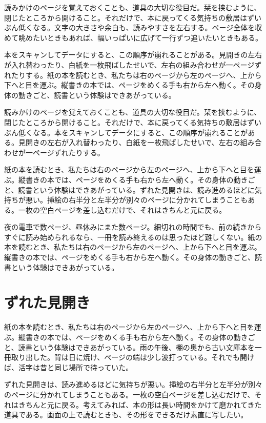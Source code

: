 \documentclass[a5paper,11pt]{ltjtbook}
\begin{document}
読みかけのページを覚えておくことも、道具の大切な役目だ。栞を挟むように、閉じたところから開けること。それだけで、本に戻ってくる気持ちの敷居はずいぶん低くなる。文字の大きさや余白も、読みやすさを左右する。ページ全体を収めて眺めたいときもあれば、幅いっぱいに広げて一行ずつ追いたいときもある。

本をスキャンしてデータにすると、この順序が崩れることがある。見開きの左右が入れ替わったり、白紙を一枚飛ばしたせいで、左右の組み合わせが一ページずれたりする。紙の本を読むとき、私たちは右のページから左のページへ、上から下へと目を運ぶ。縦書きの本では、ページをめくる手も右から左へ動く。その身体の動きごと、読書という体験はできあがっている。

読みかけのページを覚えておくことも、道具の大切な役目だ。栞を挟むように、閉じたところから開けること。それだけで、本に戻ってくる気持ちの敷居はずいぶん低くなる。本をスキャンしてデータにすると、この順序が崩れることがある。見開きの左右が入れ替わったり、白紙を一枚飛ばしたせいで、左右の組み合わせが一ページずれたりする。

紙の本を読むとき、私たちは右のページから左のページへ、上から下へと目を運ぶ。縦書きの本では、ページをめくる手も右から左へ動く。その身体の動きごと、読書という体験はできあがっている。ずれた見開きは、読み進めるほどに気持ちが悪い。挿絵の右半分と左半分が別々のページに分かれてしまうこともある。一枚の空白ページを差し込むだけで、それはきちんと元に戻る。

夜の電車で数ページ、昼休みにまた数ページ。細切れの時間でも、前の続きからすぐに読み始められるなら、一冊を読み終えるのは思ったほど難しくない。紙の本を読むとき、私たちは右のページから左のページへ、上から下へと目を運ぶ。縦書きの本では、ページをめくる手も右から左へ動く。その身体の動きごと、読書という体験はできあがっている。

\chapter{ずれた見開き}
紙の本を読むとき、私たちは右のページから左のページへ、上から下へと目を運ぶ。縦書きの本では、ページをめくる手も右から左へ動く。その身体の動きごと、読書という体験はできあがっている。雨の午後、棚の奥から古い文庫本を一冊取り出した。背は日に焼け、ページの端は少し波打っている。それでも開けば、活字は昔と同じ場所で待っていた。

ずれた見開きは、読み進めるほどに気持ちが悪い。挿絵の右半分と左半分が別々のページに分かれてしまうこともある。一枚の空白ページを差し込むだけで、それはきちんと元に戻る。考えてみれば、本の形は長い時間をかけて磨かれてきた道具である。画面の上で読むときも、その形をできるだけ素直に写したい。
\end{document}
